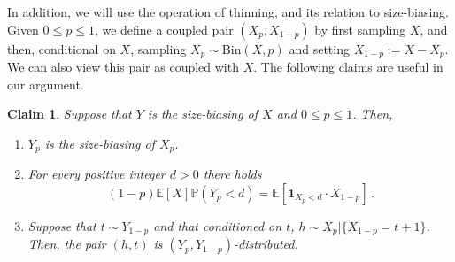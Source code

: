 \documentclass[reqno,english]{amsart}
\numberwithin{equation}{section}
\newtheorem{claim}[theorem]{Claim}
\theoremstyle{definition}{
\newtheorem{example}[theorem]{Example}
\newtheorem{definition}[theorem]{Definition}
\newtheorem*{definition*}{Definition}
\newtheorem{problem}[theorem]{Problem}
\newtheorem{question}[theorem]{Question}
}
\newcommand{\E}{\mathbb E}
\renewcommand{\P}{\mathbb P}
\newcommand{\Bin}{\mathrm{Bin}}
\begin{document}
In addition, we will use the operation of thinning, and its relation to size-biasing. Given $0\le p \le 1$, we define a coupled pair $(X_p,X_{1-p})$ by 
first sampling $X$, and then, conditional on $X$, sampling $X_p\sim \Bin(X,p)$ and setting $X_{1-p}:=X-X_p$. We can also view this pair as coupled with $X$.
The following claims are useful in our argument.
\begin{claim}\label{clm:sizeBias_new_claim}
Suppose that $Y$ is the size-biasing of $X$ and $0\le p\le 1$. Then,
\begin{enumerate}
\item $Y_p$ is the size-biasing of $X_p$.
\item For every positive integer $d>0$ there holds $$(1-p)\E[X]\P(Y_p<d)=\E[\mathbf 1_{X_p<d}\cdot X_{1-p}]\,.$$
\item Suppose that $t\sim Y_{1-p}$ and that conditioned on $t$, $h\sim X_p | \{X_{1-p}=t+1\}$. Then, the pair $(h,t)$ is $(Y_p,Y_{1-p})$-distributed.
\end{enumerate}
\end{claim}
\end{document}
